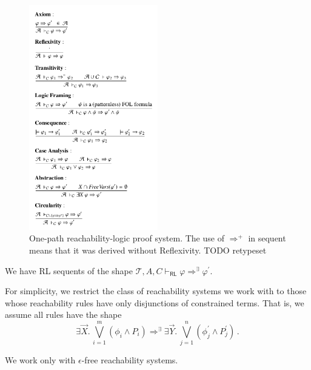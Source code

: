 \documentclass{article}
\newcommand{\RL}{\mathsf{RL}}
\begin{document}
\begin{definition}
\begin{figure}
    \centering
    \includegraphics[width=0.5\textwidth]{img/onepath-rl.png}
    \caption{One-path reachability-logic proof system.
    The use of $\Rightarrow^+$ in sequent means that it was derived without Reflexivity.
    TODO retypeset}
    \label{fig:RLproofsystem}
\end{figure}

We have RL sequents of the shape
$\mathcal{T}, A, C \vdash_\RL \varphi \Rightarrow^\exists \varphi^\prime$.

\end{definition}

\begin{remark}\label{rem:shapeOfReachabilityRules}
For simplicity, we restrict the class of reachability systems we work with to those whose reachability rules
have only disjunctions of constrained terms. That is, we assume all rules have the shape
\begin{equation*}
    \exists \vec{X}.\, \bigvee_{i=1}^{m} (\phi_i \land P_i) \Rightarrow^\exists \exists \vec{Y}.\, \bigvee_{j=1}^{n} (\phi^\prime_j \land P^\prime_j) \, .
\end{equation*}
\end{remark}

\begin{remark}\label{rem:noEmptySteps}
We work only with $\epsilon$-free reachability systems.
\end{remark}
\end{document}
